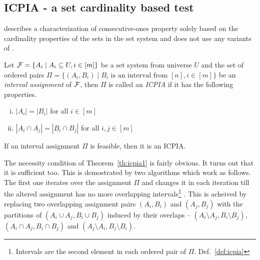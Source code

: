 


\subsection{ICPIA - a set cardinality based \COP test}
\label{sec:icpiasurvey}

\cite{nsnrs09} describes a characterization of consecutive-ones
property solely based on the cardinality properties of the sets in the
set system and does not use any variants of \PQtrees. 

\begin{definition}
  \label{def:icpia}
  Let ${\cal F} = \{A_i \mid A_i \subseteq U, i \in [m]\}$ be a set system
  from universe $U$ and the set of ordered pairs $\Pi = \{(A_i, B_i)
  \mid B_i  \text{ is an interval from } [n], i \in [m]\}$ be an {\em interval
    assignment} of ${\cal F}$, then $\Pi$ is called an {\em ICPIA} if it has
  the following properties.
  \begin{enumerate}[i.]
  \item $|A_i| = |B_i|$ for all $i \in [m]$
  \item $|A_i \cap A_j| = |B_i \cap B_j|$ for all $i, j \in [m]$
  \end{enumerate}
\end{definition}

\begin{theoremsansproof}
  \label{th:icpia1}
  If an interval assignment $\Pi$ is feasible, then it is an ICPIA.
\end{theoremsansproof}

The necessity condition of Theorem~\ref{th:icpia1} is fairly
obvious. It turns out that it is sufficient too.  This is demostrated
by two algorithms which work as follows. The first one iterates over
the assignment $\Pi$ %
and changes it in each iteration till the altered
assignment %
has no more overlapping intervals\footnote{Intervals are the second
  element in each ordered pair of $\Pi$. Def.~\ref{def:icpia}} %
\cite[Alg.~1]{nsnrs09}. This is acheived by replacing two overlapping
assignment pairs $(A_i, B_i)$ and $(A_j, B_j)$ with the partitions of
$(A_i \cup A_j,B_i \cup B_j)$ induced by their overlaps -- $(A_i
\setminus A_j, B_i \setminus B_j)$, $(A_i \cap A_j, B_i \cap B_j)$ and
$(A_j \setminus A_i, B_j \setminus B_i)$.

